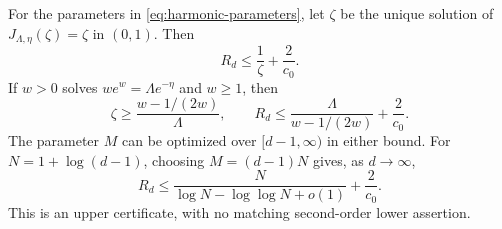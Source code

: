 \begin{theorem}\label{thm:harmonic-fixed-point}
For the parameters in \eqref{eq:harmonic-parameters}, let $\zeta$ be the
unique solution of $J_{\Lambda,\eta}(\zeta)=\zeta$ in $(0,1)$. Then
\begin{equation}\label{eq:harmonic-fixed-point-bound}
 R_d\le\frac1\zeta+\frac2{c_0}.
\end{equation}
If $w>0$ solves $we^w=\Lambda e^{-\eta}$ and $w\ge1$, then
\begin{equation}\label{eq:lambert-bound}
 \zeta\ge\frac{w-1/(2w)}{\Lambda},\qquad
 R_d\le\frac{\Lambda}{w-1/(2w)}+\frac2{c_0}.
\end{equation}
The parameter $M$ can be optimized over $[d-1,\infty)$ in either bound.
For $N=1+\log(d-1)$, choosing $M=(d-1)N$ gives, as $d\to\infty$,
\begin{equation}\label{eq:second-order-upper}
 R_d\le\frac{N}{\log N-\log\log N+o(1)}+\frac2{c_0}.
\end{equation}
This is an upper certificate, with no matching second-order lower assertion.
\end{theorem}
